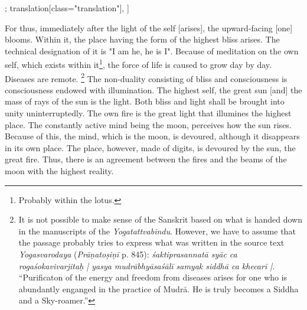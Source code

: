 \begin{alignment}[
  texts=edition[class="edition"];
  translation[class="translation"],
  ]
\begin{translation}
\begin{tlate}[p47_02]
      For thus, immediately after the light of the self [arises], the upward-facing [one] blooms. Within it, the place having the form of the highest bliss arises. The technical designation of it is "I am he, he is I". Because of meditation on the own self, which exists within it\footnote{Probably within the lotus.}, the force of life is caused to grow day by day. Diseases are remote. \crazy{\textbf{\Large{\sic{\ldots}}}}\footnote{It is not possible to make sense of the Sanskrit based on what is handed down in the manuscripts of the \textit{Yogatattvabindu}. However, we have to assume that the passage probably tries to express what was written in the source text \textit{Yogasvarodaya} (\textit{Prāṇatoṣiṇī} p. 845): \textit{śaktiprasannatā syāc ca rogaśokavivarjitaḥ | yasya mudrābhyāsaśālī samyak siddhā ca  khecarī |}. ``Purificaton of the energy and freedom from diseases arises for one who is abundantly enganged in the practice of Mudrā. He is truly becomes a Siddha and a Sky-roamer.''} The non-duality consisting of bliss and consciousness is consciousness endowed with illumination. The highest self, the great sun [and] the mass of rays of the sun is the light. Both bliss and light shall be brought into unity uninterruptedly. The own fire is the great light that illumines the highest place. The constantly active mind being the moon, perceives how the sun rises. Because of this, the mind, which is the moon, is devoured, although it disappears in its own place. The place, however, made of digits, is devoured by the sun, the great fire. Thus, there is an agreement between the fires and the beams of the moon with the highest reality.%

\end{tlate}
\end{translation}
\end{alignment}
